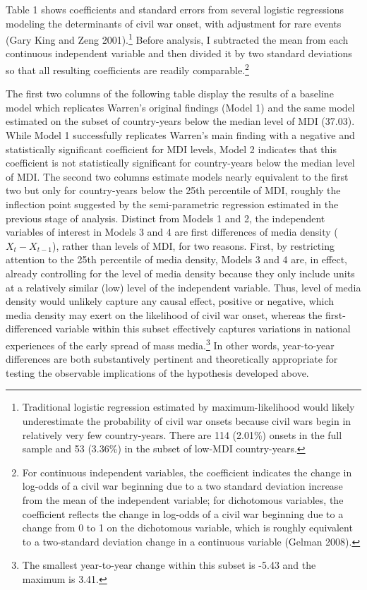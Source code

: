 \documentclass[11pt,article,oneside]{memoir}
\begin{document}
Table 1 shows coefficients and standard errors from several logistic
regressions modeling the determinants of civil war onset, with
adjustment for rare events (Gary King and Zeng 2001).\footnote{Traditional
  logistic regression estimated by maximum-likelihood would likely
  underestimate the probability of civil war onsets because civil wars
  begin in relatively very few country-years. There are 114 (2.01\%)
  onsets in the full sample and 53 (3.36\%) in the subset of low-MDI
  country-years.} Before analysis, I subtracted the mean from each
continuous independent variable and then divided it by two standard
deviations so that all resulting coefficients are readily
comparable.\footnote{For continuous independent variables, the
  coefficient indicates the change in log-odds of a civil war beginning
  due to a two standard deviation increase from the mean of the
  independent variable; for dichotomous variables, the coefficient
  reflects the change in log-odds of a civil war beginning due to a
  change from 0 to 1 on the dichotomous variable, which is roughly
  equivalent to a two-standard deviation change in a continuous variable
  (Gelman 2008).}

The first two columns of the following table display the results of a
baseline model which replicates Warren's original findings (Model 1) and
the same model estimated on the subset of country-years below the median
level of MDI (37.03). While Model 1 successfully replicates Warren's
main finding with a negative and statistically significant coefficient
for MDI levels, Model 2 indicates that this coefficient is not
statistically significant for country-years below the median level of
MDI. The second two columns estimate models nearly equivalent to the
first two but only for country-years below the 25th percentile of MDI,
roughly the inflection point suggested by the semi-parametric regression
estimated in the previous stage of analysis. Distinct from Models 1 and
2, the independent variables of interest in Models 3 and 4 are first
differences of media density ($X_{t} - X_{t-1}$), rather than levels of
MDI, for two reasons. First, by restricting attention to the 25th
percentile of media density, Models 3 and 4 are, in effect, already
controlling for the level of media density because they only include
units at a relatively similar (low) level of the independent variable.
Thus, level of media density would unlikely capture any causal effect,
positive or negative, which media density may exert on the likelihood of
civil war onset, whereas the first-differenced variable within this
subset effectively captures variations in national experiences of the
early spread of mass media.\footnote{The smallest year-to-year change
  within this subset is -5.43 and the maximum is 3.41.} In other words,
year-to-year differences are both substantively pertinent and
theoretically appropriate for testing the observable implications of the
hypothesis developed above.
\end{document}
